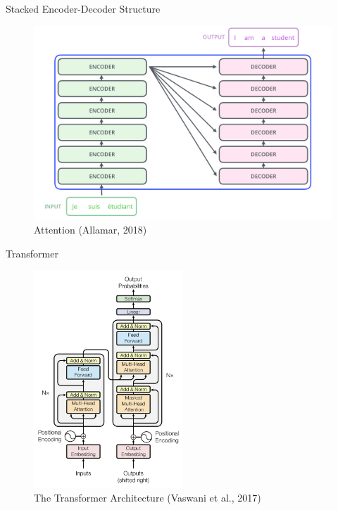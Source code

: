 \documentclass[10pt]{beamer}
\begin{document}
\begin{frame}{Stacked Encoder-Decoder Structure}

\begin{figure}[h]
\centering
\includegraphics[width=1\textwidth]{fig/alammar_The_transformer_encoder_decoder_stack}
\caption{Attention (Allamar, 2018)}
\end{figure}

\end{frame}


\begin{frame}{Transformer}

\begin{figure}[h]
\centering
\includegraphics[width=0.5\textwidth]{fig/Vaswani_1_transformer.png}
\caption{The Transformer Architecture (Vaswani et al., 2017)}
\end{figure}



\end{frame}
\end{document}
